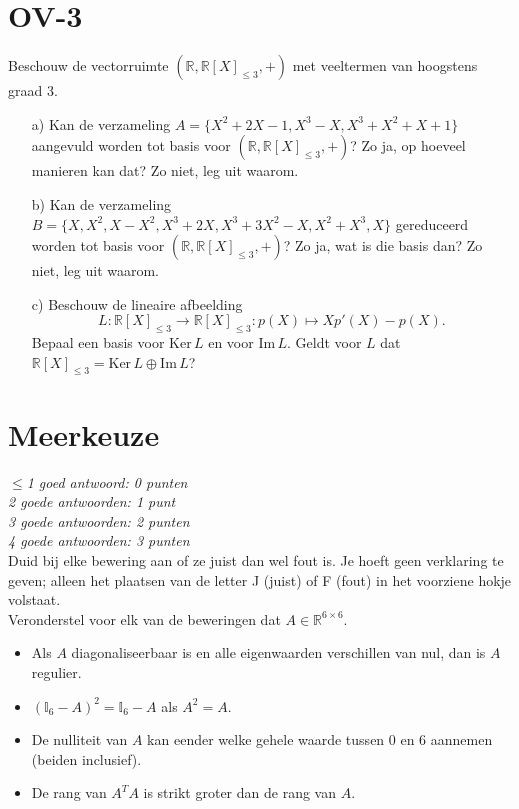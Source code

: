 \documentclass[kulak]{kulakarticle} %
\newcommand{\R}{\mathbb{R}} %
\begin{document}
\section*{OV-3}

Beschouw de vectorruimte \((\R, \R[X]_{\leq 3}, +)\) met veeltermen van hoogstens graad 3.

\begin{itemize}
	\item[a)] Kan de verzameling \(A=\{ X^2+2X-1, X^3-X, X^3+X^2+X+1 \}\) aangevuld worden tot basis voor \((\R, \R[X]_{\leq 3}, +)\)? Zo ja, op hoeveel manieren kan dat? Zo niet, leg uit waarom.
	\item[b)] Kan de verzameling \(B = \{ X, X^2, X-X^2, X^3+2X, X^3+3X^2-X, X^2+X^3,X \}\) gereduceerd worden tot basis voor \((\R, \R[X]_{\leq 3}, +)\)? Zo ja, wat is die basis dan? Zo niet, leg uit waarom.
	\item[c)] Beschouw de lineaire afbeelding \[L:\R[X]_{\leq 3}\to \R[X]_{\leq 3} : p(X) \mapsto Xp'(X)-p(X).\] Bepaal een basis voor \(\text{Ker} \,L\) en voor \(\text{Im} \,L\). Geldt voor \(L\) dat \(\R[X]_{\leq 3}= \text{Ker} \,L \oplus \text{Im} \,L\)?
\end{itemize}

\newpage

\section*{Meerkeuze}

\textit{\(\leq\)1 goed antwoord: 0 punten\\
2 goede antwoorden: 1 punt\\
3 goede antwoorden: 2 punten\\
4 goede antwoorden: 3 punten
}\\

Duid bij elke bewering aan of ze juist dan wel fout is. Je hoeft geen verklaring te geven; alleen het plaatsen van de letter J (juist) of F (fout) in het voorziene hokje volstaat.\\

Veronderstel voor elk van de beweringen dat \(A\in\R^{6\times 6}\).

\begin{itemize}
	\item Als \(A\) diagonaliseerbaar is en alle eigenwaarden verschillen van nul, dan is \(A\) regulier.
	\item \(  (\mathbb{I}_6-A)^2=\mathbb{I}_6-A  \) als \(A^2=A\).
	\item De nulliteit van \(A\) kan eender welke gehele waarde tussen 0 en 6 aannemen (beiden inclusief).
	\item De rang van \(A^TA\) is strikt groter dan de rang van \(A\).
\end{itemize}
\end{document}
